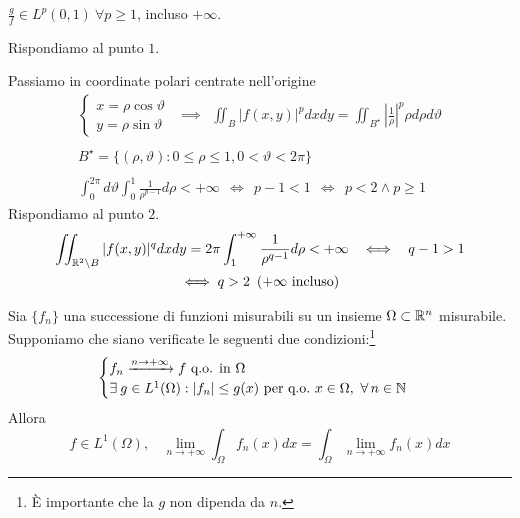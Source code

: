 $\frac{g}{f} \in L^{p}(0, 1) \ \forall p \geq 1$, incluso $ + \infty $.
\Soluzione

Rispondiamo al punto $1$.

Passiamo in coordinate polari centrate nell'origine
\begin{gather*}
\begin{cases}
x = \rho \cos \vartheta \\
y = \rho \sin \vartheta
\end{cases} \ \ \implies \ \ \iint_{B}| f(x, y)|^{p} dxdy = \iint_{B^{\star}}\left| \frac{1}{\rho}\right|^{p} \rho d\rho d\vartheta \\
\\
B^{\star} = \{(\rho, \vartheta) :0 \leq \rho \leq 1, 0 < \vartheta < 2\pi \}\\
\\
\int^{2\pi}_{0} d\vartheta \int^{1}_{0}\frac{1}{\rho^{p - 1}} d\rho < + \infty \ \ \iff \ \ p - 1 < 1\ \ \iff \ \ p < 2\land p \geq 1
\end{gather*}
Rispondiamo al punto $2$.
\begin{gather*}
\iint_{\mathbb{R}^{2} \setminus B}| f(x, y)|^{q} dxdy = 2\pi \int^{+ \infty}_{1}\frac{1}{\rho^{q - 1}} d\rho < + \infty \ \ \iff \ \ q - 1 > 1\\
\iff q > 2\ \left(+ \infty \ \text{incluso}\right)
\end{gather*}
\Soluzione
\begin{thm}
 Sia $\{f_{n}\}$ una successione di funzioni misurabili su un insieme $\Omega \subset \mathbb{R}^{n}$ misurabile. Supponiamo che siano verificate le seguenti due condizioni:\footnote{È importante che la $g$ non dipenda da $n$.}
\begin{equation*}
\begin{cases}
f_{n}\xrightarrow{n\rightarrow + \infty} f\ \text{q.o. in} \ \Omega \\
\exists g\in L^{1}(\Omega) :| f_{n}| \leq g(x) \ \text{per q.o.} \ x\in \Omega, \ \forall n\in \NN
\end{cases}
\end{equation*}
Allora
\begin{equation*}
f\in L^{1}(\Omega), \ \ \ \ \lim_{n\rightarrow + \infty}\int_{\Omega} f_{n}(x) dx = \int_{\Omega}\lim_{n\rightarrow + \infty} f_{n}(x) dx
\end{equation*}
\end{thm}
